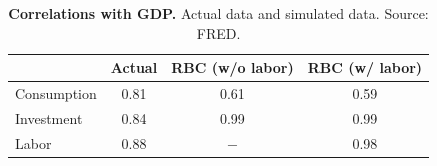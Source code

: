 \begin{table}[h] \caption{\label{tab014_intro_prescott_rbc_corrs} \textbf{Correlations with GDP.} Actual data and simulated data. {\tiny Source: FRED}.}
\begin{center}\hspace*{-.5cm}

\begin{tabular}{lccc}
\toprule
{} &  Actual & RBC (w/o labor) &  RBC (w/ labor) \\
\midrule
Consumption &    0.81 &            0.61 &            0.59 \\
Investment  &    0.84 &            0.99 &            0.99 \\
Labor       &    0.88 &             $-$ &            0.98 \\
\bottomrule
\end{tabular}
\end{center}
\end{table}